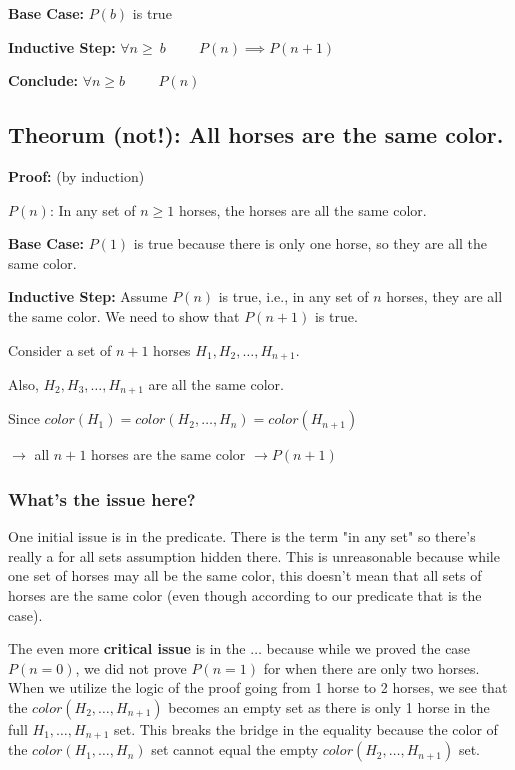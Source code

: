 \documentclass[11pt]{article}
\begin{document}
\textbf{Base Case:} \(P(b)\) is true

\textbf{Inductive Step:} \(\forall n \geq\ b \hspace{1cm} P(n) \implies P(n+1)\)

\textbf{Conclude:} \(\forall n \geq b \hspace{1cm} P(n)\)

\subsection*{Theorum (not!): All horses are the same color.}

\textbf{Proof:} (by induction)

\(P(n)\): In any set of \(n \geq 1\) horses, the horses are all the same color.

\textbf{Base Case:} \(P(1)\) is true because there is only one horse, so they are all the same color.

\textbf{Inductive Step:} Assume \(P(n)\) is true, i.e., in any set of \(n\) horses, they are all the same color. We need to show that \(P(n+1)\) is true.
\vspace{.5cm}

Consider a set of \( n+1 \) horses \(H_{1}, H_{2}, \ldots, H_{n+1}\).

Also, \(H_{2}, H_{3}, \ldots, H_{n+1}\) are all the same color.

Since \(color(H_{1}) = color(H_{2}, \ldots, H_{n}) = color(H_{n+1})\)

\(\rightarrow\) all \(n+1\) horses are the same color \(\rightarrow P(n+1)\)  \quad \checkmark

\subsubsection*{What's the issue here?}

One initial issue is in the predicate. There is the term "in any set" so there's really a for all sets assumption hidden there. This is unreasonable because while one set of horses may all be the same color, this doesn't mean that all sets of horses are the same color (even though according to our predicate that is the case).

The even more \textbf{critical issue} is in the \(\ldots\) because while we proved the case \(P(n=0)\), we did not prove \(P(n=1)\) for when there are only two horses. When we utilize the logic of the proof going from 1 horse to 2 horses, we see that the \(color(H_{2}, \ldots, H_{n+1})\) becomes an empty set as there is only 1 horse in the full \(H_{1}, \ldots, H_{n+1}\) set. This breaks the bridge in the equality because the color of the \(color(H_{1}, \ldots, H_{n})\) set cannot equal the empty \(color(H_{2}, \ldots, H_{n+1})\) set.
\end{document}
